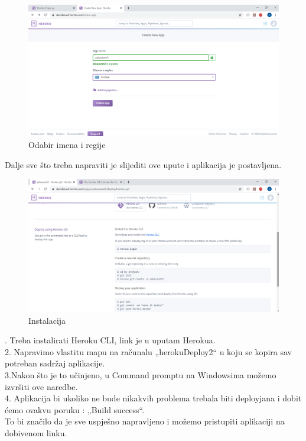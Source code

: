 \begin{figure}[H]
	\includegraphics[scale=0.4]{slike/ime_i_regija.PNG}
	\centering
	\caption{Odabir imena i regije}
	\label{fig:pogon4}
\end{figure}

\normalfont Dalje sve što treba napraviti je slijediti ove upute i aplikacija je postavljena. 

\begin{figure}[H]
	\includegraphics[scale=0.4]{slike/upute.PNG}
	\centering
	\caption{Instalacija}
	\label{fig:pogon5}
\end{figure}

. Treba instalirati Heroku CLI, link je u uputam Herokua.\\
2. Napravimo vlastitu mapu na računalu „herokuDeploy2“ u koju se kopira sav potreban sadržaj aplikacije.\\
3.Nakon što je to učinjeno, u Command promptu na Windowsima možemo izvršiti ove naredbe.\\
4. Aplikacija bi ukoliko ne bude nikakvih problema trebala biti deployjana i dobit ćemo ovakvu poruku : „Build success“.\\
To bi značilo da je sve uspješno napravljeno i možemo pristupiti aplikaciji na dobivenom linku.
\eject 